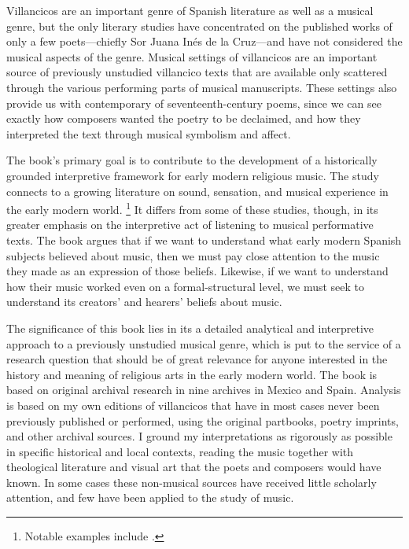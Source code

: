 \documentclass{vcbook-proposal}
\begin{document}
Villancicos are an important genre of Spanish literature as well as a musical genre, but the only literary studies have concentrated on the published works of only a few poets---chiefly Sor Juana Inés de la Cruz---and have not considered the musical aspects of the genre.%
  \autocite{Tenorio:SorJuana}
Musical settings of villancicos are an important source of previously unstudied villancico texts that are available only scattered through the various performing parts of musical manuscripts.
These settings also provide us with contemporary  of seventeenth-century poems, since we can see exactly how composers wanted the poetry to be declaimed, and how they interpreted the text through musical symbolism and affect.

The book's primary goal is to contribute to the development of a historically grounded interpretive framework for early modern religious music.
The study connects to a growing literature on sound, sensation, and musical experience in the early modern world.%
  \footnote{Notable examples include \autocites{Rath:EarlyAmerica}{Feldman:Opera}{Feldman:Passions}
  {Austern:Nature}{Gouk:MusicScienceMagic}{LeGuin:BoccheriniBody}.}
It differs from some of these studies, though, in its greater emphasis on the interpretive act of listening to musical performative texts.
The book argues that if we want to understand what early modern Spanish subjects believed about music, then we must pay close attention to the music they made as an expression of those beliefs.
Likewise, if we want to understand how their music worked even on a formal-structural level, we must seek to understand its creators' and hearers' beliefs about music.

The significance of this book lies in its a detailed analytical and interpretive approach to a previously unstudied musical genre, which is put to the service of a research question that should be of great relevance for anyone interested in the history and meaning of religious arts in the early modern world.
The book is based on original archival research in nine archives in Mexico and Spain.
Analysis is based on my own editions of villancicos that have in most cases never been previously published or performed, using the original partbooks, poetry imprints, and other archival sources.
I ground my interpretations as rigorously as possible in specific historical and local contexts, reading the music together with theological literature and visual art that the poets and composers would have known.
In some cases these non-musical sources have received little scholarly attention, and few have been applied to the study of music.
\end{document}
